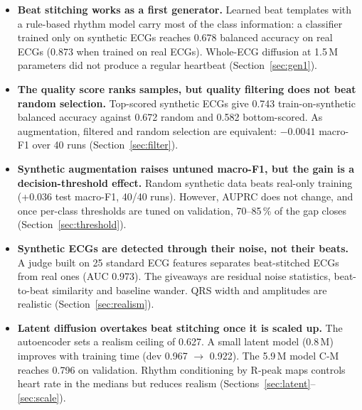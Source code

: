 \documentclass[11pt,a4paper]{article}
\newif\ifsecbreak \secbreaktrue
\begin{document}
\begin{itemize}
\item \textbf{Beat stitching works as a first generator.} Learned beat templates with a rule-based rhythm model carry
  most of the class information: a classifier trained only on synthetic ECGs reaches 0.678 balanced accuracy on
  real ECGs (0.873 when trained on real ECGs). Whole-ECG diffusion at 1.5\,M parameters did not produce a regular
  heartbeat (Section~\ref{sec:gen1}).
\item \textbf{The quality score ranks samples, but quality filtering does not beat random selection.} Top-scored
  synthetic ECGs give 0.743 train-on-synthetic balanced accuracy against 0.672 random and 0.582 bottom-scored.
  As augmentation, filtered and random selection are equivalent: $-0.0041$ macro-F1 over 40 runs (Section~\ref{sec:filter}).
\item \textbf{Synthetic augmentation raises untuned macro-F1, but the gain is a decision-threshold effect.} Random
  synthetic data beats real-only training (+0.036 test macro-F1, 40/40 runs). However, AUPRC does not change, and
  once per-class thresholds are tuned on validation, 70--85\,\% of the gap closes (Section~\ref{sec:threshold}).
\item \textbf{Synthetic ECGs are detected through their noise, not their beats.} A judge built on 25 standard ECG
  features separates beat-stitched ECGs from real ones (AUC 0.973). The giveaways are residual noise statistics, beat-to-beat
  similarity and baseline wander. QRS width and amplitudes are realistic (Section~\ref{sec:realism}).
\item \textbf{Latent diffusion overtakes beat stitching once it is scaled up.} The autoencoder sets a realism
  ceiling of 0.627. A small latent model (0.8\,M) improves with training time (dev 0.967 $\rightarrow$ 0.922).
  The 5.9\,M model C-M reaches 0.796 on validation. Rhythm conditioning by R-peak maps controls heart rate in the
  medians but reduces realism (Sections~\ref{sec:latent}--\ref{sec:scale}).
\end{itemize}

\clearpage
\secbreakfalse
\listoffigures
\listoftables
\secbreaktrue
\clearpage

\end{document}
